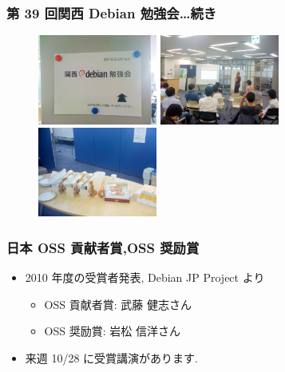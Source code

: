 \documentclass[cjk,dvipdfmx,12pt,%
hyperref={bookmarks=true,bookmarksnumbered=true,bookmarksopen=false,%
colorlinks=false,%
pdftitle={第40回 関西Debian勉強会},%
pdfauthor={倉敷・のがた・佐々木},%
pdfsubject={資料},%
}]{beamer}
\begin{document}
\begin{frame}[fragile]
\frametitle{第 39 回関西 Debian 勉強会\dots{}続き}


\begin{figure}[h]
    \centering
    \includegraphics[width=0.35\textwidth]{image201010/kansaidebian1.jpg}
    \includegraphics[width=0.35\textwidth]{image201010/kansaidebian2.jpg}
    \includegraphics[width=0.35\textwidth]{image201010/kansaidebian3.jpg}
\end{figure}


\end{frame}

\begin{frame}[fragile]
\frametitle{日本 OSS 貢献者賞,OSS 奨励賞}

\begin{itemize}
\item 2010 年度の受賞者発表, Debian JP Project より

\begin{itemize}
\item OSS 貢献者賞: 武藤 健志さん
\item OSS 奨励賞: 岩松 信洋さん
\end{itemize}
\item 来週 10/28 に受賞講演があります.
\end{itemize}

\end{frame}
\end{document}
